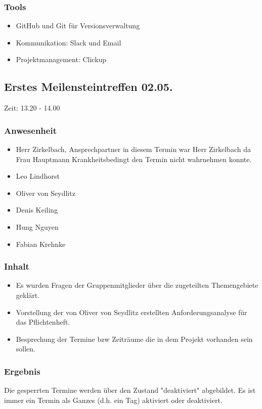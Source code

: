 \subsubsection{Tools}
\begin{itemize}
	\item GitHub und Git für Versionsverwaltung 
	\item Kommunikation: Slack und Email
	\item Projektmanagement: Clickup
\end{itemize}



\subsection{Erstes Meilensteintreffen 02.05.} 

Zeit: 13.20 - 14.00

\subsubsection{Anwesenheit}
\begin{itemize}
	\item Herr Zirkelbach, Ansprechpartner in diesem Termin war Herr Zirkelbach da Frau Hauptmann Krankheitsbedingt den Termin nicht wahrnehmen konnte.
	\item Leo Lindhorst
	\item Oliver von Seydlitz
	\item Denis Keiling
	\item Hung Nguyen
	\item Fabian Krehnke
\end{itemize}

\subsubsection{Inhalt}
\begin{itemize}
\item Es wurden Fragen der Gruppenmitglieder über die zugeteilten    Themengebiete geklärt.
\item Vorstellung der von Oliver von Seydlitz erstellten Anforderungsanalyse für das Pflichtenheft. 
\item Besprechung der Termine bzw Zeiträume die in dem Projekt vorhanden sein sollen.
\end{itemize}

\subsubsection{Ergebnis}
Die gesperrten Termine werden über den Zustand "deaktiviert" abgebildet. Es ist immer ein Termin als Ganzes (d.h. ein Tag) aktiviert oder deaktiviert.


